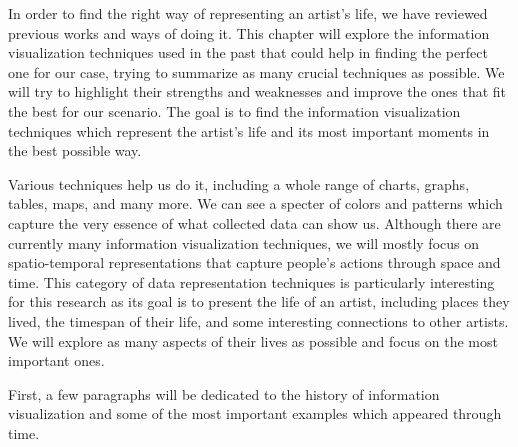 In order to find the right way of representing an artist’s life, we have reviewed previous works and ways of doing it.
This chapter will explore the information visualization techniques used in the past that could help in finding the
perfect one for our case, trying to summarize as many crucial techniques as possible. We will try to highlight their
strengths and weaknesses and improve the ones that fit the best for our scenario. The goal is to find the information
visualization techniques which represent the artist’s life and its most important moments in the best possible way.

Various techniques help us do it, including a whole range of charts, graphs, tables, maps, and many more. We can see a specter of
colors and patterns which capture the very essence of what collected data can show us. Although there are currently many
information visualization techniques, we will mostly focus on spatio-temporal representations that capture people's actions through space
and time. This category of data representation techniques is particularly interesting for this research as its goal is
to present the life of an artist, including places they lived, the timespan of their life, and some interesting
connections to other artists. We will explore as many aspects of their lives as possible and focus on the most
important ones.

First, a few paragraphs will be dedicated to the history of information visualization and some of the most important
examples which appeared through time.
